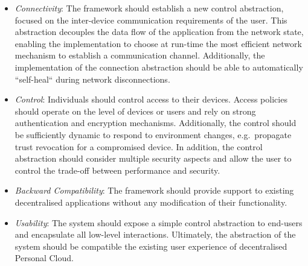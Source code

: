 \begin{itemize}
  \item {\it Connectivity}\/: The framework should establish a new
    control abstraction, focused on the inter-device communication
    requirements of the user. This abstraction decouples the data flow of
    the application from the network state, enabling the implementation to
    choose at run-time the most efficient network mechanism to establish
    a communication channel. Additionally, the implementation of the
    connection abstraction should be able to automatically “self-heal“ 
    during network disconnections.

  \item {\it Control}\/: Individuals should control access to their devices.
    Access policies should operate on the level of devices or users and rely on
    strong authentication and encryption mechanisms. Additionally, the
    control should be sufficiently dynamic to respond to environment 
    changes, e.g.~propagate trust revocation for a compromised device. In
    addition, the control abstraction should consider multiple 
    security aspects and allow the user to control the trade-off between
    performance and security.
   
  \item {\it Backward Compatibility}\/: The framework should provide support
    to existing decentralised applications without any modification
    of their functionality.

  \item {\it Usability}\/: The system should expose a simple control abstraction
    to end-users and encapsulate all low-level interactions. Ultimately, the
    abstraction of the system should be compatible the existing user experience
    of decentralised Personal Cloud. 
    

 \end{itemize}


